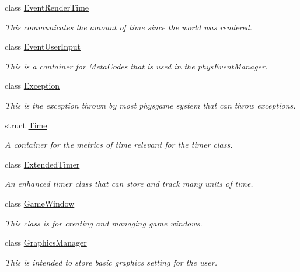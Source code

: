 \begin{DoxyCompactItemize}
class \hyperlink{classphys_1_1EventRenderTime}{EventRenderTime}
\begin{DoxyCompactList}\small\item\em This communicates the amount of time since the world was rendered. \item\end{DoxyCompactList}\item 
class \hyperlink{classphys_1_1EventUserInput}{EventUserInput}
\begin{DoxyCompactList}\small\item\em This is a container for MetaCodes that is used in the physEventManager. \item\end{DoxyCompactList}\item 
class \hyperlink{classphys_1_1Exception}{Exception}
\begin{DoxyCompactList}\small\item\em This is the exception thrown by most physgame system that can throw exceptions. \item\end{DoxyCompactList}\item 
struct \hyperlink{structphys_1_1Time}{Time}
\begin{DoxyCompactList}\small\item\em A container for the metrics of time relevant for the timer class. \item\end{DoxyCompactList}\item 
class \hyperlink{classphys_1_1ExtendedTimer}{ExtendedTimer}
\begin{DoxyCompactList}\small\item\em An enhanced timer class that can store and track many units of time. \item\end{DoxyCompactList}\item 
class \hyperlink{classphys_1_1GameWindow}{GameWindow}
\begin{DoxyCompactList}\small\item\em This class is for creating and managing game windows. \item\end{DoxyCompactList}\item 
class \hyperlink{classphys_1_1GraphicsManager}{GraphicsManager}
\begin{DoxyCompactList}\small\item\em This is intended to store basic graphics setting for the user. \item\end{DoxyCompactList}\item 

\end{DoxyCompactItemize}
